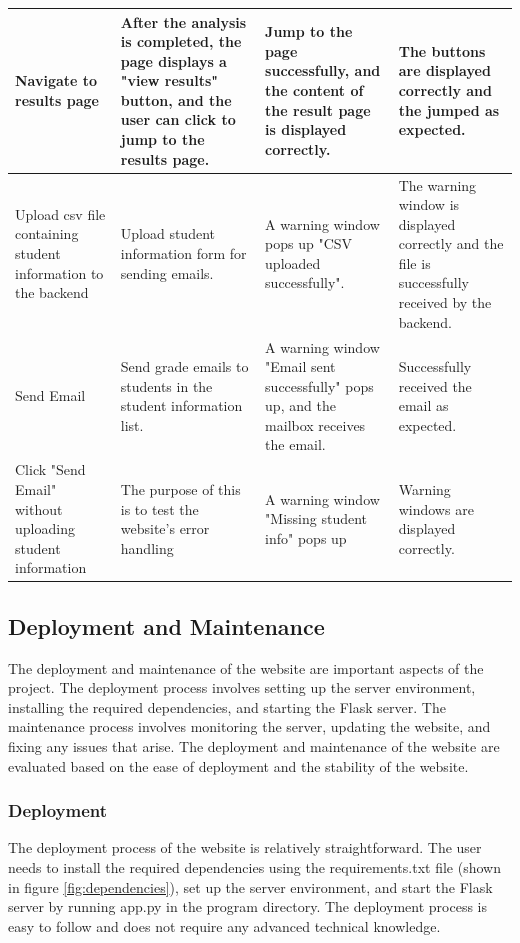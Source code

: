 \documentclass[twocolumn]{article}
\begin{document}
\begin{table}[htbp]
\begin{tabularx}{\textwidth}{|X|X|X|X|}
        Navigate to results page & After the analysis is completed, the page displays a "view results" button, and the user can click to jump to the results page. & Jump to the page successfully, and the content of the result page is displayed correctly. & The buttons are displayed correctly and the jumped as expected. \\ \hline
        Upload csv file containing student information to the backend& Upload student information form for sending emails. & A warning window pops up "CSV uploaded successfully". & The warning window is displayed correctly and the file is successfully received by the backend. \\ \hline
        Send Email & Send grade emails to students in the student information list. & A warning window "Email sent successfully" pops up, and the mailbox receives the email. & Successfully received the email as expected. \\ \hline
        Click "Send Email" without uploading student information &The purpose of this is to test the website's error handling & A warning window "Missing student info" pops up & Warning windows are displayed correctly. \\ \hline
        \end{tabularx}
    \end{table}

\subsection{Deployment and Maintenance}
The deployment and maintenance of the website are important aspects of the project. The deployment process involves setting up the server environment, installing the required dependencies, and starting the Flask server. The maintenance process involves monitoring the server, updating the website, and fixing any issues that arise. The deployment and maintenance of the website are evaluated based on the ease of deployment and the stability of the website.

\subsubsection{Deployment}
The deployment process of the website is relatively straightforward. The user needs to install the required dependencies using the requirements.txt file (shown in figure \ref{fig:dependencies}), set up the server environment, and start the Flask server by running app.py in the program directory. The deployment process is easy to follow and does not require any advanced technical knowledge. 
\end{document}
